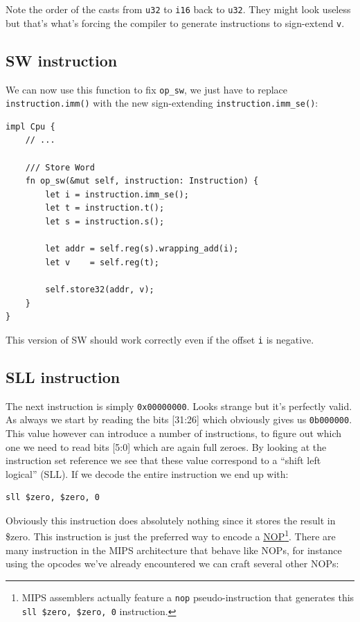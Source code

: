 \documentclass[a4paper]{article}
\newcommand{\code}[1] {\texttt{#1}}
\begin{document}
Note the order of the casts from \code{u32} to \code{i16} back to
\code{u32}. They might look useless but that's what's forcing the
compiler to generate instructions to sign-extend \code{v}.

\subsection{SW instruction}

We can now use this function to fix \code{op\_sw}, we just have to
replace \code{instruction.imm()} with the new sign-extending
\code{instruction.imm\_se()}:

\begin{lstlisting}
impl Cpu {
    // ...

    /// Store Word
    fn op_sw(&mut self, instruction: Instruction) {
        let i = instruction.imm_se();
        let t = instruction.t();
        let s = instruction.s();

        let addr = self.reg(s).wrapping_add(i);
        let v    = self.reg(t);

        self.store32(addr, v);
    }
}
\end{lstlisting}

This version of SW should work correctly even if the offset \code{i}
is negative.

\subsection{SLL instruction}

The next instruction is simply \code{0x00000000}. Looks strange but
it's perfectly valid. As always we start by reading the bits [31:26]
which obviously gives us \code{0b000000}. This value however can
introduce a number of instructions, to figure out which one we need to
read bits [5:0] which are again full zeroes. By looking at the
instruction set reference we see that these value correspond to a
``shift left logical'' (SLL). If we decode the entire instruction we
end up with:

\begin{lstlisting}[language=assembly]
sll $zero, $zero, 0
\end{lstlisting}

Obviously this instruction does absolutely nothing since it stores the
result in \$zero. This instruction is just the preferred way to encode
a \href{https://en.wikipedia.org/wiki/NOP}{NOP}\footnote{MIPS
  assemblers actually feature a \code{nop} pseudo-instruction that
  generates this \mbox{\code{sll \$zero, \$zero, 0}} instruction.}.
There are many instruction in the MIPS architecture that behave like
NOPs, for instance using the opcodes we've already encountered we can
craft several other NOPs:
\end{document}
